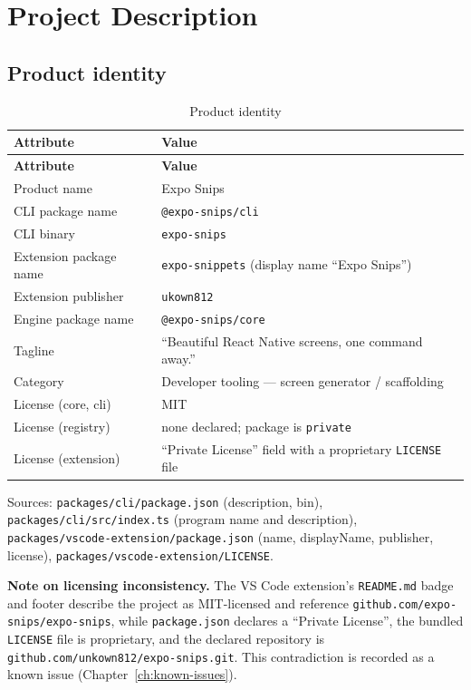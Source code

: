 \chapter{Project Description}
\label{ch:project-description}

\section{Product identity}

\begin{longtable}{@{}L{4.4cm}L{10cm}@{}}
\caption{Product identity}\\
\toprule
\textbf{Attribute} & \textbf{Value} \\
\midrule
\endfirsthead
\toprule
\textbf{Attribute} & \textbf{Value} \\
\midrule
\endhead
Product name & Expo Snips \\
CLI package name & \texttt{@expo-snips/cli} \\
CLI binary & \texttt{expo-snips} \\
Extension package name & \texttt{expo-snippets} (display name ``Expo Snips'') \\
Extension publisher & \texttt{ukown812} \\
Engine package name & \texttt{@expo-snips/core} \\
Tagline & ``Beautiful React Native screens, one command away.'' \\
Category & Developer tooling --- screen generator / scaffolding \\
License (core, cli) & MIT \\
License (registry) & none declared; package is \texttt{private} \\
License (extension) & ``Private License'' field with a proprietary \texttt{LICENSE} file \\
\bottomrule
\end{longtable}

Sources: \texttt{packages/cli/package.json} (description, bin),
\texttt{packages/cli/src/index.ts} (program name and description),
\texttt{packages/vscode-extension/package.json} (name, displayName, publisher,
license), \texttt{packages/vscode-extension/LICENSE}.

\textbf{Note on licensing inconsistency.} The VS Code extension's
\texttt{README.md} badge and footer describe the project as MIT-licensed and
reference \texttt{github.com/expo-snips/expo-snips}, while
\texttt{package.json} declares a ``Private License'', the bundled \texttt{LICENSE}
file is proprietary, and the declared repository is
\texttt{github.com/unkown812/expo-snips.git}. This contradiction is recorded as a
known issue (Chapter~\ref{ch:known-issues}).

